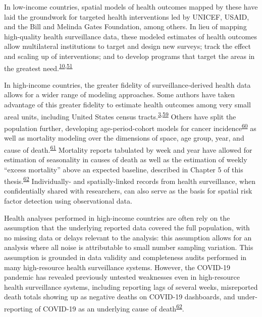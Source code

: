 \documentclass[
]{article}
\begin{document}
In low-income countries, spatial models of health outcomes mapped by these have laid the groundwork for targeted health interventions led by UNICEF, USAID, and the Bill and Melinda Gates Foundation, among others. In lieu of mapping high-quality health surveillance data, these modeled estimates of health outcomes allow multilateral institutions to target and design new surveys; track the effect and scaling up of interventions; and to develop programs that target the areas in the greatest need.\textsuperscript{\protect\hyperlink{ref-Diggle2016}{10},\protect\hyperlink{ref-Pigott2015}{51}}

In high-income countries, the greater fidelity of surveillance-derived health data allows for a wider range of modeling approaches. Some authors have taken advantage of this greater fidelity to estimate health outcomes among very small areal units, including United States census tracts.\textsuperscript{\protect\hyperlink{ref-Dwyer-Lindgren2017}{3},\protect\hyperlink{ref-Zhang2014}{59}} Others have split the population further, developing age-period-cohort models for cancer incidence\textsuperscript{\protect\hyperlink{ref-Papoila2014}{60}} as well as mortality modeling over the dimensions of space, age group, year, and cause of death.\textsuperscript{\protect\hyperlink{ref-Dwyer-Lindgren2016}{61}} Mortality reports tabulated by week and year have allowed for estimation of seasonality in causes of death as well as the estimation of weekly ``excess mortality'' above an expected baseline, described in Chapter 5 of this thesis.\textsuperscript{\protect\hyperlink{ref-Weinberger2020a}{62}} Individually- and spatially-linked records from health surveillance, when confidentially shared with researchers, can also serve as the basis for spatial risk factor detection using observational data.

Health analyses performed in high-income countries are often rely on the assumption that the underlying reported data covered the full population, with no missing data or delays relevant to the analysis: this assumption allows for an analysis where all noise is attributable to small number sampling variation. This assumption is grounded in data validity and completeness audits performed in many high-resource health surveillance systems. However, the COVID-19 pandemic has revealed previously untested weaknesses even in high-resource health surveillance systems, including reporting lags of several weeks, misreported death totals showing up as negative deaths on COVID-19 dashboards, and under-reporting of COVID-19 as an underlying cause of death\textsuperscript{\protect\hyperlink{ref-Weinberger2020a}{62}}.
\end{document}
